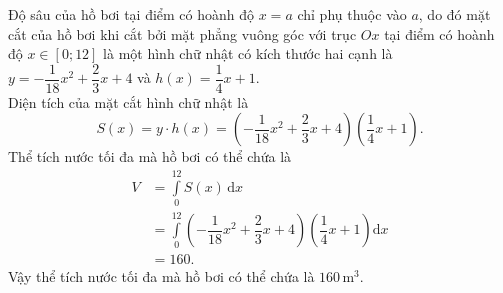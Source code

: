 \begin{ex}
{		Độ sâu của hồ bơi tại điểm có hoành độ $x=a$ chỉ phụ thuộc vào $a$, do đó mặt cắt của hồ bơi khi cắt bởi mặt phẳng vuông góc với trục $Ox$ tại điểm có hoành độ $x \in [0;12]$ là một hình chữ nhật có kích thước hai cạnh là $y=-\dfrac{1}{18}x^2+\dfrac{2}{3}x+4$ và $h(x)=\dfrac{1}{4}x+1$.\\
		Diện tích của mặt cắt hình chữ nhật là
		\[S(x)=y \cdot h(x)=\left(-\dfrac{1}{18}x^2+\dfrac{2}{3}x+4 \right) \left(\dfrac{1}{4}x+1\right).\]
		Thể tích nước tối đa mà hồ bơi có thể chứa là
		\allowdisplaybreaks
		\begin{align*}
			V &= \displaystyle\int\limits_0^{12} S(x) \mathrm{\,d}x \\
			&= \displaystyle\int\limits_0^{12} \left(-\dfrac{1}{18}x^2+\dfrac{2}{3}x+4 \right) \left(\dfrac{1}{4}x+1\right) \mathrm{d}x \\
			&= 160.
		\end{align*}
		Vậy thể tích nước tối đa mà hồ bơi có thể chứa là $160$\,m$^3$.
	}
\end{ex}

